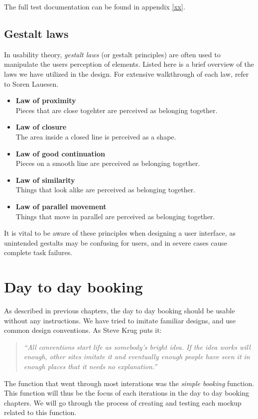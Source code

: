 The full test documentation can be found in appendix \ref{xx}.

\subsection{Gestalt laws}
In usability theory, \emph{gestalt laws} (or gestalt principles) are often used to manipulate the users perception of elements. Listed here is a brief overview of the laws we have utilized in the design. For extensive walkthrough of each law, refer to Soren Lauesen\cite{lauesen}. 
\begin{itemize}
\item \textbf{Law of proximity} \\
Pieces that are close togehter are perceived as belonging together.
\item \textbf{Law of closure} \\
The area inside a closed line is perceived as a shape.
\item \textbf{Law of good continuation} \\
Pieces on a smooth line are perceived as belonging together.
\item \textbf{Law of similarity} \\
Things that look alike are perceived as belonging together.
\item \textbf{Law of parallel movement} \\
Things that move in parallel are perceived as belonging together.
\end{itemize}

It is vital to be aware of these principles when designing a user interface, as unintended gestalts may be confusing for users, and in severe cases cause complete task failures.\cite{lauesen}

\section{Day to day booking}
\label{sec:day_to_day_booking_ui}
As described in previous chapters, the day to day booking should be usable without any instructions. We have tried to imitate familiar designs, and use common design conventions. As Steve Krug puts it\cite{steve}: 
\begin{quotation}
\emph{``All conventions start life as somebody's bright idea. If the idea works will enough, other sites imitate it and eventually enough people have seen it in enough places that it needs no explanation.''}
\end{quotation}
The function that went through most interations was the \emph{simple booking} function. This function will thus be the focus of each iterations in the day to day booking chapters. We will go through the process of creating and testing each mockup related to this function.\\
